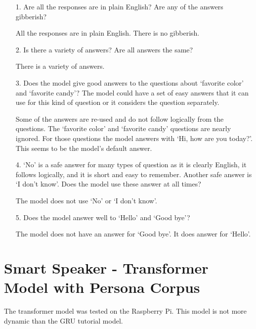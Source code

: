 \begin{itemize}
	\item [1.] Are all the responses are in plain English? Are any of the answers gibberish?
	
	\item []All the responses are in plain English. There is no gibberish.
	
	\item [2.] Is there a  variety of answers? Are all answers the same?
	
	\item []There is a variety of answers. 
	
	\item [3.] Does the model give good answers to the questions about `favorite color' and `favorite candy'? The model could have a set of easy answers that it can use for this kind of question or it considers the question separately. 
	
	\item []Some of the answers are re-used and do not follow logically from the questions. The `favorite color' and `favorite candy' questions are nearly ignored. For those questions the model answers with `Hi, how are you today?'. This seems to be the model's default answer.
	
	\item [4.] `No' is a safe answer for many types of question as it is clearly English, it follows logically, and it is short and easy to remember. Another safe answer is `I don't know'. Does the model use these answer at all times?
	
	\item []The model does not use `No' or `I don't know'.
	
	\item [5.] Does the model answer well to `Hello' and `Good bye'?
	
	\item []The model does not have an answer for `Good bye'. It does answer for `Hello'.
	
\end{itemize}


\section{Smart Speaker - Transformer Model with Persona Corpus}

The transformer model was tested on the Raspberry Pi. This model is not more dynamic than the GRU tutorial model. 

